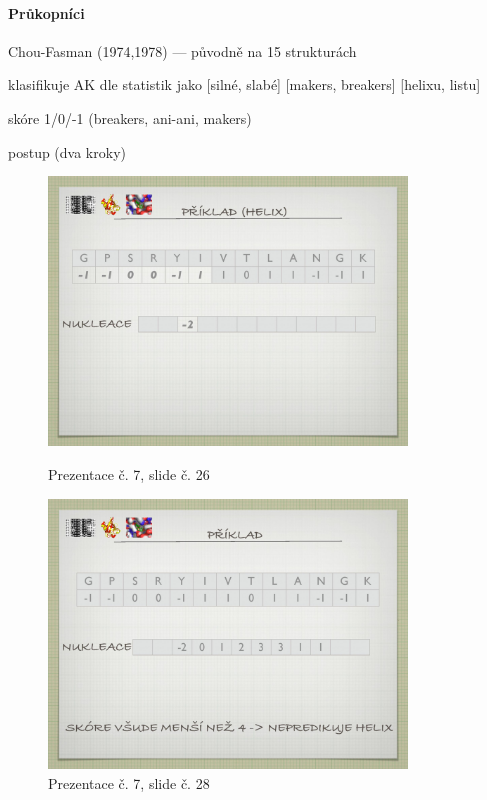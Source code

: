 \documentclass[DIV=8]{scrreprt}
\begin{document}
\paragraph{Průkopníci}
\begin{myItemize}[nosep]
    \item Chou-Fasman (1974,1978) --- původně na 15 strukturách
    \item klasifikuje AK dle statistik jako [silné, slabé] [makers, breakers] [helixu, listu]
\begin{myItemize}[nosep]
    \item skóre 1/0/-1 (breakers, ani-ani, makers)
\end{myItemize}

    \item postup (dva kroky) \begin{figure}
    \caption{Prezentace č. 7, slide č. 26}
    \includegraphics[width=0.85\textwidth]{slides-7/slide-26.jpg}
    \centering
    \label{slides-7-slide-26}
\end{figure}
\begin{figure}
    \caption{Prezentace č. 7, slide č. 28}
    \includegraphics[width=0.85\textwidth]{slides-7/slide-28.jpg}

\end{figure}
\end{myItemize}
\end{document}
